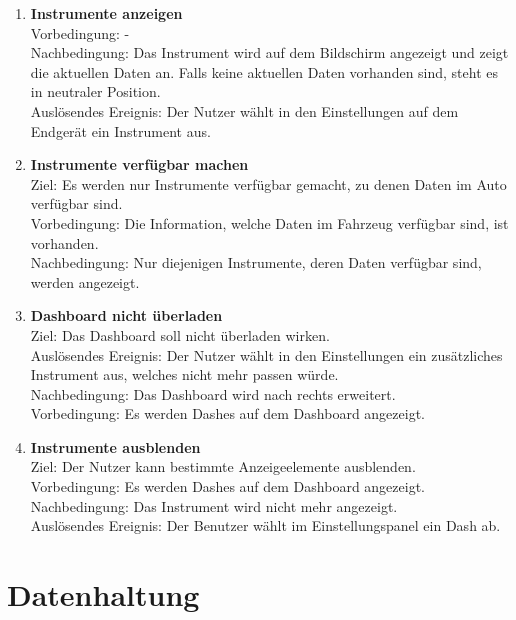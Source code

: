 \documentclass[pflichtenheft.tex]{subfiles}
\begin{document}
	\begin{enumerate}
	\setcounter{enumi}{\value{enumTemp}}
		\item{\textbf{Instrumente anzeigen}} \\Vorbedingung: - \\ Nachbedingung: Das Instrument wird auf dem Bildschirm angezeigt und zeigt die aktuellen Daten an. Falls keine aktuellen Daten vorhanden sind, steht es in neutraler Position. \\ Auslösendes Ereignis: Der Nutzer wählt in den Einstellungen auf dem Endgerät ein Instrument aus.

		\item{\textbf{Instrumente verfügbar machen}} \\
		Ziel: Es werden nur Instrumente verfügbar gemacht, zu denen Daten im Auto verfügbar sind. \\
		Vorbedingung: Die Information, welche Daten im Fahrzeug verfügbar sind, ist vorhanden. \\
		Nachbedingung: Nur diejenigen Instrumente, deren Daten verfügbar sind, werden angezeigt.

		\item{\textbf{Dashboard nicht überladen}} \\Ziel: Das Dashboard soll nicht überladen wirken.\\
		Auslösendes Ereignis: Der Nutzer wählt in den Einstellungen ein zusätzliches Instrument aus, welches nicht mehr passen würde.\\ Nachbedingung: Das Dashboard wird nach rechts erweitert. \\ Vorbedingung: Es werden Dashes auf dem Dashboard angezeigt.

		\item{\textbf{Instrumente ausblenden}} \\
		Ziel: Der Nutzer kann bestimmte Anzeigeelemente ausblenden.\\
		Vorbedingung: Es werden Dashes auf dem Dashboard angezeigt.\\
		Nachbedingung: Das Instrument wird nicht mehr angezeigt.\\
		Auslösendes Ereignis: Der Benutzer wählt im Einstellungspanel ein Dash ab.
		\setcounter{enumTemp}{\value{enumi}}
	\end{enumerate} 
	
	\section{Datenhaltung}
\end{document}

